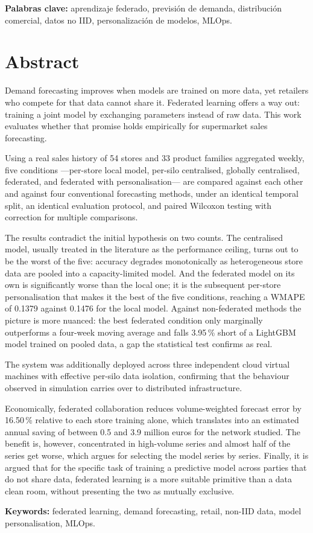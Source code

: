 \vspace{1em}
\noindent\textbf{Palabras clave:} aprendizaje federado, previsión de demanda, distribución
comercial, datos no IID, personalización de modelos, MLOps.

\chapter*{Abstract}

Demand forecasting improves when models are trained on more data, yet retailers who compete for
that data cannot share it. Federated learning offers a way out: training a joint model by
exchanging parameters instead of raw data. This work evaluates whether that promise holds
empirically for supermarket sales forecasting.

Using a real sales history of 54 stores and 33 product families aggregated weekly, five conditions
—per-store local model, per-silo centralised, globally centralised, federated, and federated with
personalisation— are compared against each other and against four conventional forecasting methods,
under an identical temporal split, an identical evaluation protocol, and paired Wilcoxon testing
with correction for multiple comparisons.

The results contradict the initial hypothesis on two counts. The centralised model, usually treated
in the literature as the performance ceiling, turns out to be the worst of the five: accuracy
degrades monotonically as heterogeneous store data are pooled into a capacity-limited model. And
the federated model on its own is significantly worse than the local one; it is the subsequent
per-store personalisation that makes it the best of the five conditions, reaching a WMAPE of 0.1379
against 0.1476 for the local model. Against non-federated methods the picture is more nuanced: the
best federated condition only marginally outperforms a four-week moving average and falls 3.95\,\%
short of a LightGBM model trained on pooled data, a gap the statistical test confirms as real.

The system was additionally deployed across three independent cloud virtual machines with effective
per-silo data isolation, confirming that the behaviour observed in simulation carries over to
distributed infrastructure.

Economically, federated collaboration reduces volume-weighted forecast error by 16.50\,\% relative
to each store training alone, which translates into an estimated annual saving of between 0.5 and
3.9 million euros for the network studied. The benefit is, however, concentrated in high-volume
series and almost half of the series get worse, which argues for selecting the model series by
series. Finally, it is argued that for the specific task of training a predictive model across
parties that do not share data, federated learning is a more suitable primitive than a data clean
room, without presenting the two as mutually exclusive.

\vspace{1em}
\noindent\textbf{Keywords:} federated learning, demand forecasting, retail, non-IID data, model
personalisation, MLOps.
